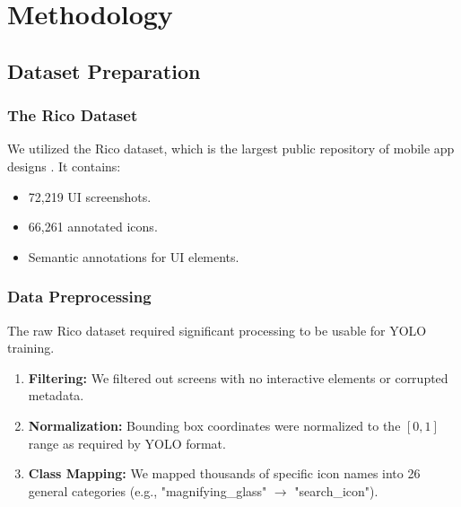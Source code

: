 \documentclass[11pt,a4paper]{report}
\begin{document}
\chapter{Methodology}

\section{Dataset Preparation}
\subsection{The Rico Dataset}
We utilized the Rico dataset, which is the largest public repository of mobile app designs \cite{rico}. It contains:
\begin{itemize}
    \item 72,219 UI screenshots.
    \item 66,261 annotated icons.
    \item Semantic annotations for UI elements.
\end{itemize}

\subsection{Data Preprocessing}
The raw Rico dataset required significant processing to be usable for YOLO training.
\begin{enumerate}
    \item \textbf{Filtering:} We filtered out screens with no interactive elements or corrupted metadata.
    \item \textbf{Normalization:} Bounding box coordinates were normalized to the $[0, 1]$ range as required by YOLO format.
    \item \textbf{Class Mapping:} We mapped thousands of specific icon names into 26 general categories (e.g., "magnifying\_glass" $\rightarrow$ "search\_icon").
\end{enumerate}
\end{document}
